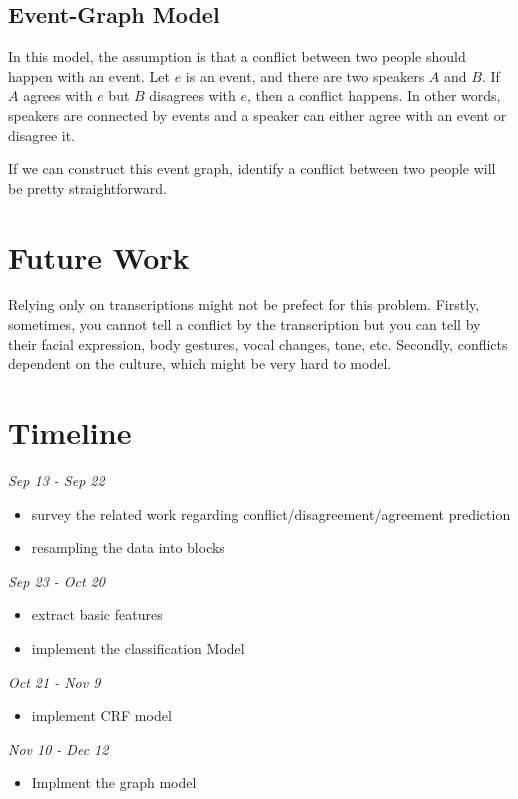\documentclass[11pt,letterpaper]{article}
\begin{document}
\subsection{Event-Graph Model}
In this model, the assumption is that a conflict between two people should happen with an event. Let $e$ is an event, and there are two speakers $A$ and $B$. If $A$ agrees with $e$ but $B$ disagrees with $e$, then a conflict happens. In other words, speakers are connected by events and a speaker can either agree with an event or disagree it.

If we can construct this event graph, identify a conflict between two people will be pretty straightforward.

\section{Future Work}
Relying only on transcriptions might not be prefect for this problem. Firstly, sometimes, you cannot tell a conflict by the transcription but you can tell by their facial expression, body gestures, vocal changes, tone, etc. Secondly, conflicts dependent on the culture, which might be very hard to model.

\section{Timeline}

\noindent \emph{Sep 13 - Sep 22}
\begin{itemize}
  \item survey the related work regarding conflict/disagreement/agreement prediction
  \item resampling the data into blocks
\end{itemize}

\noindent \emph{Sep 23 -  Oct 20}
\begin{itemize}
  \item extract basic features
  \item implement the classification Model
\end{itemize}

\noindent \emph{Oct 21 - Nov 9}
\begin{itemize}
  \item implement CRF model
\end{itemize}

\noindent \emph{Nov 10 - Dec 12}
\begin{itemize}
  \item Implment the graph model
\end{itemize}
\end{document}
